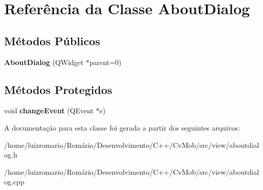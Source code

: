 \hypertarget{classAboutDialog}{
\section{Referência da Classe AboutDialog}
\label{classAboutDialog}
}
\subsection*{Métodos Públicos}
\begin{DoxyCompactItemize}
\item 
\hypertarget{classAboutDialog_ad96fc2ce8de7568ace543b7c69c71c56}{
{\bfseries AboutDialog} (QWidget $\ast$parent=0)}
\label{classAboutDialog_ad96fc2ce8de7568ace543b7c69c71c56}

\end{DoxyCompactItemize}
\subsection*{Métodos Protegidos}
\begin{DoxyCompactItemize}
\item 
\hypertarget{classAboutDialog_abac18da2759d1b4bb0e5bca856b0efcf}{
void {\bfseries changeEvent} (QEvent $\ast$e)}
\label{classAboutDialog_abac18da2759d1b4bb0e5bca856b0efcf}

\end{DoxyCompactItemize}


A documentação para esta classe foi gerada a partir dos seguintes arquivos:\begin{DoxyCompactItemize}
\item 
/home/luizromario/Romário/Desenvolvimento/C++/CvMob/src/view/aboutdialog.h\item 
/home/luizromario/Romário/Desenvolvimento/C++/CvMob/src/view/aboutdialog.cpp\end{DoxyCompactItemize}
